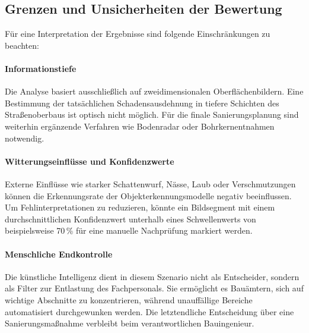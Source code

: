 \subsection{Grenzen und Unsicherheiten der Bewertung}
\label{subsec:grenzen}

Für eine Interpretation der Ergebnisse sind folgende Einschränkungen zu beachten:

\paragraph{Informationstiefe}
Die Analyse basiert ausschließlich auf zweidimensionalen Oberflächenbildern. Eine Bestimmung der tatsächlichen Schadensausdehnung in tiefere Schichten des Straßenoberbaus ist optisch nicht möglich. Für die finale Sanierungsplanung sind weiterhin ergänzende Verfahren wie Bodenradar oder Bohrkernentnahmen notwendig.

\paragraph{Witterungseinflüsse und Konfidenzwerte}
Externe Einflüsse wie starker Schattenwurf, Nässe, Laub oder Verschmutzungen können die Erkennungsrate der Objekterkennungsmodelle negativ beeinflussen. Um Fehlinterpretationen zu reduzieren, könnte ein Bildsegment mit einem durchschnittlichen Konfidenzwert unterhalb eines Schwellenwerts von beispielsweise 70\,\% für eine manuelle Nachprüfung markiert werden.

\paragraph{Menschliche Endkontrolle}
Die künstliche Intelligenz dient in diesem Szenario nicht als Entscheider, sondern als Filter zur Entlastung des Fachpersonals. Sie ermöglicht es Bauämtern, sich auf wichtige Abschnitte zu konzentrieren, während unauffällige Bereiche automatisiert durchgewunken werden. Die letztendliche Entscheidung über eine Sanierungsmaßnahme verbleibt beim verantwortlichen Bauingenieur.